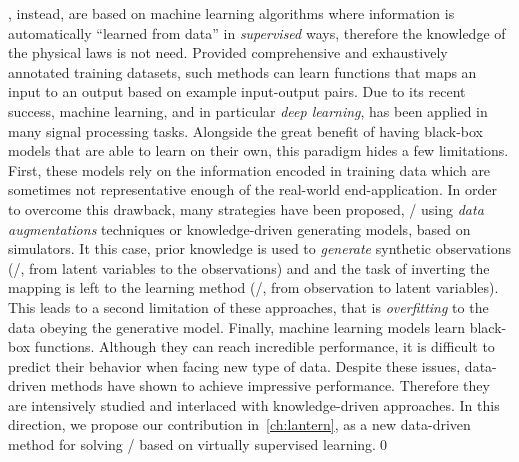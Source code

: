 , instead, are based on machine learning algorithms where information is automatically ``learned from data'' in \textit{supervised} ways, therefore the knowledge of the physical laws is not need.
Provided comprehensive and exhaustively annotated training datasets, such methods can learn functions that maps an input to an output based on example input-output pairs.
Due to its recent success, machine learning, and in particular \textit{deep learning}, has been applied in many signal processing tasks.
Alongside the great benefit of having black-box models that are able to learn on their own, this paradigm hides a few limitations.
\\First, these models rely on the information encoded in training data which are sometimes not representative enough of the real-world end-application.
In order to overcome this drawback, many strategies have been proposed, \eg/ using\textit{ data augmentations} techniques or knowledge-driven generating models, based on simulators.
It this case, prior knowledge is used to \textit{generate} synthetic observations (\ie/, from latent variables to the observations) and
and the task of inverting the mapping is left to the learning method (\ie/, from observation to latent variables).
This leads to a second limitation of these approaches, that is \textit{overfitting} to the data obeying the generative model.
Finally, machine learning models learn black-box functions.
Although they can reach incredible performance, it is difficult to predict their behavior when facing new type of data.
Despite these issues, data-driven methods have shown to achieve impressive performance.
Therefore they are intensively studied and interlaced with knowledge-driven approaches.
In this direction, we propose our contribution in~\cref{ch:lantern}, as a new data-driven method for solving \AER/ based on virtually supervised learning.\qed



